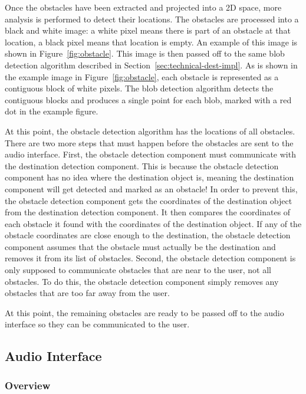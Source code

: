 Once the obstacles have been extracted and projected into a 2D space, more
analysis is performed to detect their locations. The obstacles are processed
into a black and white image: a white pixel means there is part of an obstacle
at that location, a black pixel means that location is empty. An example of this
image is shown in Figure~\ref{fig:obstacle}. This image is then
passed off to the same blob detection algorithm described in Section~\ref{sec:technical-dest-impl}.
As is shown in the example image in
Figure~\ref{fig:obstacle}, each obstacle is represented as a contiguous block
of white pixels. The blob detection algorithm detects the contiguous blocks and
produces a single point for each blob, marked with a red dot in the example
figure.

At this point, the obstacle detection algorithm has the locations of all
obstacles. There are two more steps that must happen before the obstacles are
sent to the audio interface. First, the obstacle detection component must
communicate with the destination detection component. This is because
the obstacle detection component has no idea where the destination object is,
meaning the destination component will get detected and marked as an obstacle!
In order to prevent this, the obstacle detection component gets the coordinates
of the destination object from the destination detection component. It then
compares the coordinates of each obstacle it found with the coordinates of the
destination object. If any of the obstacle coordinates are close enough to the
destination, the obstacle detection component assumes that the obstacle must
actually be the destination and removes it from its list of obstacles. Second,
the obstacle detection component is only supposed to communicate obstacles that
are near to the user, not all obstacles. To do this, the obstacle detection
component simply removes any obstacles that are too far away from the user.

At this point, the remaining obstacles are ready to be passed off to the audio
interface so they can be communicated to the user.

\subsection{Audio Interface}
\label{sec:technical-audio}

\subsubsection{Overview}
\label{sec:technical-audio-overview}

